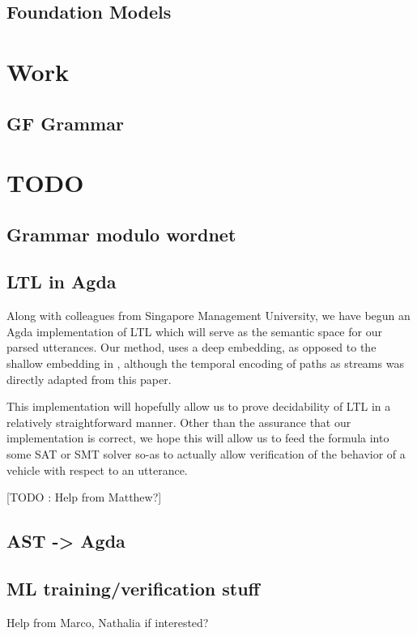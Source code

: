 \documentclass[a4paper, 11pt]{article}
\begin{document}
\subsection{Foundation Models}

\section{Work} 

\subsection{GF Grammar}

\section{TODO} 

\subsection{Grammar modulo wordnet}

\subsection{LTL in Agda}

Along with colleagues from Singapore Management University, we have begun an
Agda implementation \cite{wltl} of LTL which will serve as the semantic space
for our parsed utterances. Our method, uses a deep embedding, as opposed to the
shallow embedding in \cite{coqLTL}, although the temporal encoding of paths as
streams was directly adapted from this paper.

This implementation will hopefully allow us to prove decidability of LTL in a
relatively straightforward manner. Other than the assurance that our
implementation is correct, we hope this will allow us to feed the formula into
some SAT or SMT solver so-as to actually allow verification of the behavior of a
vehicle with respect to an utterance.

[TODO : Help from Matthew?]

\subsection{AST -> Agda}

\subsection{ML training/verification stuff}
Help from Marco, Nathalia if interested?
\end{document}
